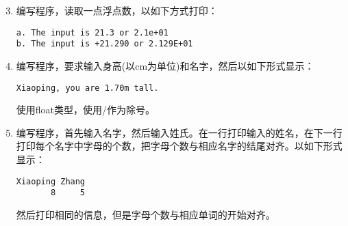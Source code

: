 \documentclass[12pt,notheorems]{beamer}
\begin{document}
\begin{frame} 

\end{frame}

\begin{frame}[fragile] 
\begin{enumerate}\setcounter{enumi}{2} 
\item 编写程序，读取一点浮点数，以如下方式打印：
\begin{lstlisting}[showspaces=true,backgroundcolor=\color{red!10}]
a. The input is 21.3 or 2.1e+01
b. The input is +21.290 or 2.129E+01
\end{lstlisting}
\end{enumerate}
\end{frame}

\begin{frame} 

\end{frame}

\begin{frame}[fragile] 
\begin{enumerate}\setcounter{enumi}{3} 
\item 编写程序，要求输入身高(以cm为单位)和名字，然后以如下形式显示：
\begin{lstlisting}[showspaces=true,backgroundcolor=\color{red!10}]
Xiaoping, you are 1.70m tall.
\end{lstlisting}
使用float类型，使用/作为除号。
\end{enumerate}
\end{frame}

\begin{frame} 

\end{frame}

\begin{frame}[fragile] 
\begin{enumerate}\setcounter{enumi}{4} 
\item 编写程序，首先输入名字，然后输入姓氏。在一行打印输入的姓名，在下一行打印每个名字中字母的个数，把字母个数与相应名字的结尾对齐。以如下形式显示：
\begin{lstlisting}[showspaces=true]
Xiaoping Zhang
       8     5
\end{lstlisting}
然后打印相同的信息，但是字母个数与相应单词的开始对齐。
\end{enumerate}
\end{frame}
\end{document}
